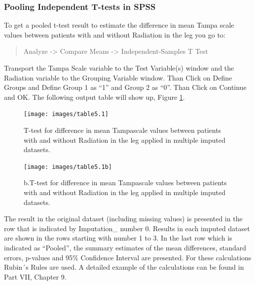 \documentclass[
]{book}
\begin{document}
\hypertarget{pooling-independent-t-tests-in-spss}{%
\subsubsection{Pooling Independent T-tests in SPSS}\label{pooling-independent-t-tests-in-spss}}

To get a pooled t-test result to estimate the difference in mean Tampa scale values between patients with and without Radiation in the leg you go to:

\begin{quote}
Analyze -\textgreater{} Compare Means -\textgreater{} Independent-Samples T Test
\end{quote}

Transport the Tampa Scale variable to the Test Variable(s) window and the Radiation variable to the Grouping Variable window. Than Click on Define Groups and Define Group 1 as ``1'' and Group 2 as ``0''. Than Click on Continue and OK. The following output table will show up, Figure \ref{fig:tab5-1a}.

\begin{figure}

{\centering \texttt{[image: images/table5.1]} 

}

\caption{T-test for difference in mean Tampascale values between patients with and without Radiation in the leg applied in multiple imputed datasets.}\label{fig:tab5-1a}
\end{figure}

\begin{figure}

{\centering \texttt{[image: images/table5.1b]} 

}

\caption{b.T-test for difference in mean Tampascale values between patients with and without Radiation in the leg applied in multiple imputed datasets.}\label{fig:tab5-1b}
\end{figure}

The result in the original dataset (including missing values) is presented in the row that is indicated by Imputation\_ number 0. Results in each imputed dataset are shown in the rows starting with number 1 to 3. In the last row which is indicated as ``Pooled'', the summary estimates of the mean differences, standard errors, p-values and 95\% Confidence Interval are presented. For these calculations Rubin´s Rules are used. A detailed example of the calculations can be found in Part VII, Chapter 9.
\end{document}
